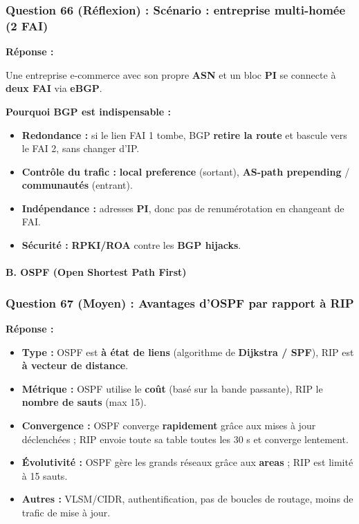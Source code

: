 \documentclass[12pt,a4paper]{article}
\newcommand{\reponse}{\textbf{Réponse :}\par}
\begin{document}
\subsubsection*{Question 66 (Réflexion) : Scénario : entreprise multi-homée (2 FAI)}

\reponse
Une entreprise e-commerce avec son propre \textbf{ASN} et un bloc
\textbf{PI} se connecte à \textbf{deux FAI} via \textbf{eBGP}.

\textbf{Pourquoi BGP est indispensable :}
\begin{itemize}
    \item \textbf{Redondance :} si le lien FAI 1 tombe, BGP
    \textbf{retire la route} et bascule vers le FAI 2, sans changer d'IP.
    \item \textbf{Contrôle du trafic :} \textbf{local preference}
    (sortant), \textbf{AS-path prepending} / \textbf{communautés}
    (entrant).
    \item \textbf{Indépendance :} adresses \textbf{PI}, donc pas de
    renumérotation en changeant de FAI.
    \item \textbf{Sécurité :} \textbf{RPKI/ROA} contre les
    \textbf{BGP hijacks}.
\end{itemize}

\paragraph{B. OSPF (Open Shortest Path First)}

\subsubsection*{Question 67 (Moyen) : Avantages d'OSPF par rapport à RIP}

\reponse
\begin{itemize}
    \item \textbf{Type :} OSPF est \textbf{à état de liens} (algorithme
    de \textbf{Dijkstra / SPF}), RIP est \textbf{à vecteur de distance}.
    \item \textbf{Métrique :} OSPF utilise le \textbf{coût} (basé sur la
    bande passante), RIP le \textbf{nombre de sauts} (max 15).
    \item \textbf{Convergence :} OSPF converge \textbf{rapidement} grâce
    aux mises à jour déclenchées ; RIP envoie toute sa table toutes les
    30 s et converge lentement.
    \item \textbf{Évolutivité :} OSPF gère les grands réseaux grâce aux
    \textbf{areas} ; RIP est limité à 15 sauts.
    \item \textbf{Autres :} VLSM/CIDR, authentification, pas de boucles
    de routage, moins de trafic de mise à jour.
\end{itemize}
\end{document}
